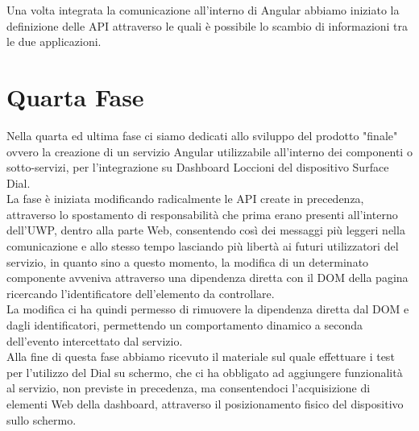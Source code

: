 Una volta integrata la comunicazione all'interno di Angular abbiamo iniziato la definizione delle API attraverso le quali è possibile lo scambio di informazioni tra le due applicazioni.

\section{Quarta Fase}

Nella quarta ed ultima fase ci siamo dedicati allo sviluppo del prodotto "finale" ovvero la creazione di un servizio Angular utilizzabile all'interno dei componenti o sotto-servizi, per l'integrazione su Dashboard Loccioni del dispositivo Surface Dial.\\

La fase è iniziata modificando radicalmente le API create in precedenza, attraverso lo spostamento di responsabilità che prima erano presenti all'interno dell'UWP, dentro alla parte Web, consentendo così dei messaggi più leggeri nella comunicazione e allo stesso tempo lasciando più libertà ai futuri utilizzatori del servizio, in quanto sino a questo momento, la modifica di un determinato componente avveniva attraverso una dipendenza diretta con il DOM della pagina ricercando l'identificatore dell'elemento da controllare.\\

La modifica ci ha quindi permesso di rimuovere la dipendenza diretta dal DOM e dagli identificatori, permettendo un comportamento dinamico a seconda dell'evento intercettato dal servizio.\\

Alla fine di questa fase abbiamo ricevuto il materiale sul quale effettuare i test per l’utilizzo del Dial su schermo, che ci ha obbligato ad aggiungere funzionalità al servizio, non previste in precedenza, ma consentendoci l'acquisizione di elementi Web della dashboard, attraverso il posizionamento fisico del dispositivo sullo schermo.




